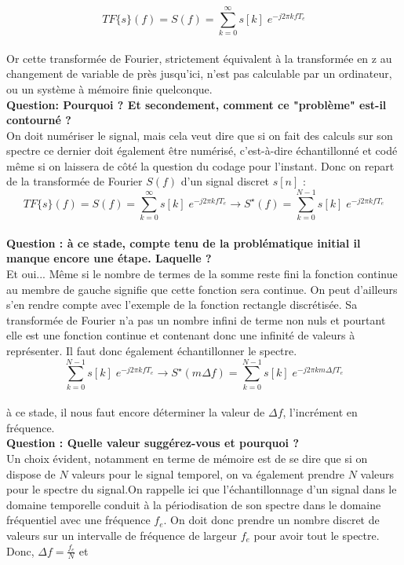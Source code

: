 \documentclass[11pt,a4paper]{article}
\begin{document}
\[ TF\lbrace s \rbrace(f) = S(f) = \sum_{k = 0}^{\infty} s[k] \; e^{-j 2 \pi k f T_e}\] \\

Or cette transformée de Fourier, strictement équivalent à la transformée en z au changement de variable de près jusqu'ici, n'est pas calculable par un ordinateur, ou un système à mémoire finie quelconque.\\

\textbf{Question: Pourquoi ? Et secondement,  comment ce "problème" est-il contourné ?}\\

On doit numériser le signal, mais cela veut dire que si on fait des calculs sur son spectre ce dernier doit également être numérisé, c'est-à-dire échantillonné et codé même si on laissera de côté la question du codage pour l'instant. Donc on repart de la transformée de Fourier $S(f)$ d'un signal discret $s[n]$ :\\

\[ TF\lbrace s \rbrace(f) = S(f) = \sum_{k = 0}^{\infty} s[k] \; e^{-j 2 \pi k f T_e} \rightarrow S^{\star} (f) =  \sum_{k = 0}^{N-1} s[k] \; e^{-j 2 \pi k f T_e} \]\\


\textbf{Question : à ce stade, compte tenu de la problématique initial il manque encore une étape. Laquelle ?}\\

Et oui... Même si le nombre de termes de la somme reste fini la fonction continue au membre de gauche signifie que cette fonction sera continue. On peut d'ailleurs s'en rendre compte avec l'exemple de la fonction rectangle discrétisée. Sa transformée de Fourier n'a pas un nombre infini de terme non nuls et pourtant elle est une fonction continue et contenant donc une infinité de valeurs à représenter. Il faut donc également échantillonner le spectre.\\

\[\sum_{k = 0}^{N-1} s[k] \; e^{-j 2 \pi k f T_e} \rightarrow S^{\star} (m \Delta f) = \sum_{k = 0}^{N-1} s[k] \; e^{-j 2 \pi k m \Delta f T_e} \]\\

à ce stade, il nous faut encore déterminer la valeur de $\Delta f$, l'incrément en fréquence.\\

\textbf{Question : Quelle valeur suggérez-vous et pourquoi ?}\\

Un choix évident, notamment en terme de mémoire est de se dire que si on dispose de $N$ valeurs pour le signal temporel, on va également prendre $N$ valeurs pour le spectre du signal.On rappelle ici que l'échantillonnage d'un signal dans le domaine temporelle conduit à la périodisation de son spectre dans le domaine fréquentiel avec une fréquence $f_e$. On doit donc prendre un nombre discret de valeurs sur un intervalle de fréquence de largeur $f_e$ pour avoir tout le spectre. Donc, $\Delta f = \frac{f_e}{N}$ et\\
\end{document}
